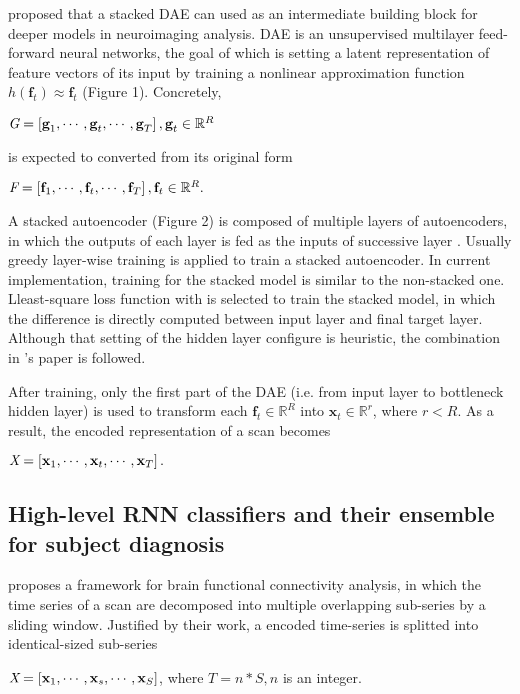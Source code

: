 \textcite{suk16} proposed that a stacked DAE can used as an intermediate building block for deeper models in neuroimaging analysis. DAE is an unsupervised multilayer feed-forward neural networks, the goal of which is setting a latent representation of feature vectors of its input by training a nonlinear approximation function $h(\textbf{f}_t) \approx \textbf{f}_t$ (Figure 1). Concretely, 
\begin{center}
$\emph{G} = \left[ \textbf{g}_1, \cdots, \textbf{g}_t, \cdots, \textbf{g}_T \right], \textbf{g}_t \in \mathbb{R}^{R}$ 
\end{center}
is expected to converted from its original form 
\begin{center}
$\emph{F} = \left[ \textbf{f}_1, \cdots, \textbf{f}_t, \cdots, \textbf{f}_T \right], \textbf{f}_t \in \mathbb{R}^{R}. $
\end{center} 

A stacked autoencoder (Figure 2) is composed of multiple layers of autoencoders, in which the outputs of each layer is fed as the inputs of successive layer \cite{stackedDAE}. Usually greedy layer-wise training is applied to train a stacked autoencoder. In current implementation, training for the stacked model is similar to the non-stacked one. Lleast-square loss function with  is selected to train the stacked model, in which the difference is directly computed between input layer and final target layer. Although that setting of the hidden layer configure is  heuristic, the combination in \textcite{suk16}'s paper is followed. 

After training, only the first part of the DAE (i.e. from input layer to bottleneck hidden layer) is used to transform each $\textbf{f}_t \in  \mathbb{R}^{R}$ into $ \textbf{x}_t \in  \mathbb{R}^{r}$, where $ r < R$. As a result, the encoded representation of a scan becomes
\begin{center}
$\emph{X} = \left[ \textbf{x}_1, \cdots, \textbf{x}_t, \cdots, \textbf{x}_T \right].$ 
\end{center}

\subsection{High-level RNN classifiers and their ensemble for subject diagnosis}

\textcite{wee15} proposes a framework for brain functional connectivity analysis, in which the time series of a scan are decomposed into multiple overlapping sub-series by a sliding window. Justified by their work, a encoded time-series is splitted into identical-sized sub-series
\begin{center}
$\emph{X} = \left[ \textbf{x}_1, \cdots, \textbf{x}_s, \cdots, \textbf{x}_{S} \right]$, where $T=n*S, n$ is an integer. 
\end{center}

